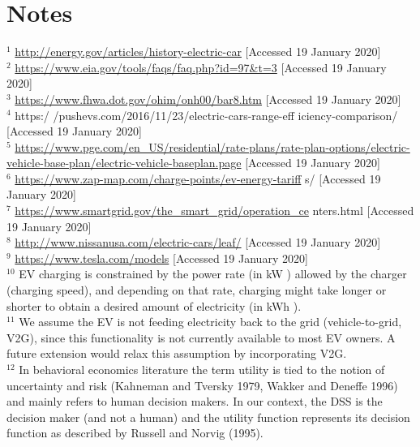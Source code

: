 \documentclass[10pt]{article}
\begin{document}
\section*{Notes}
${ }^{1}$ \href{http://energy.gov/articles/history-electric-car}{http://energy.gov/articles/history-electric-car} [Accessed 19 January 2020]\\
${ }^{2}$ \href{https://www.eia.gov/tools/faqs/faq.php?id=97&t=3}{https://www.eia.gov/tools/faqs/faq.php?id=97\&t=3} [Accessed 19 January 2020]\\
${ }^{3}$ \href{https://www.fhwa.dot.gov/ohim/onh00/bar8.htm}{https://www.fhwa.dot.gov/ohim/onh00/bar8.htm} [Accessed 19 January 2020]\\
${ }^{4}$ https:/ /pushevs.com/2016/11/23/electric-cars-range-eff iciency-comparison/ [Accessed 19 January 2020]\\
${ }^{5}$ \href{https://www.pge.com/en_US/residential/rate-plans/rate-plan-options/electric-vehicle-base-plan/electric-vehicle-baseplan.page}{https://www.pge.com/en\_US/residential/rate-plans/rate-plan-options/electric-vehicle-base-plan/electric-vehicle-baseplan.page} [Accessed 19 January 2020]\\
${ }^{6}$ \href{https://www.zap-map.com/charge-points/ev-energy-tariff}{https://www.zap-map.com/charge-points/ev-energy-tariff} s/ [Accessed 19 January 2020]\\
${ }^{7}$ \href{https://www.smartgrid.gov/the_smart_grid/operation_ce}{https://www.smartgrid.gov/the\_smart\_grid/operation\_ce} nters.html [Accessed 19 January 2020]\\
${ }^{8}$ \href{http://www.nissanusa.com/electric-cars/leaf/}{http://www.nissanusa.com/electric-cars/leaf/} [Accessed 19 January 2020]\\
${ }^{9}$ \href{https://www.tesla.com/models}{https://www.tesla.com/models} [Accessed 19 January 2020]\\
${ }^{10}$ EV charging is constrained by the power rate (in kW ) allowed by the charger (charging speed), and depending on that rate, charging might take longer or shorter to obtain a desired amount of electricity (in kWh ).\\
${ }^{11}$ We assume the EV is not feeding electricity back to the grid (vehicle-to-grid, V2G), since this functionality is not currently available to most EV owners. A future extension would relax this assumption by incorporating V2G.\\
${ }^{12}$ In behavioral economics literature the term utility is tied to the notion of uncertainty and risk (Kahneman and Tversky 1979, Wakker and Deneffe 1996) and mainly refers to human decision makers. In our context, the DSS is the decision maker (and not a human) and the utility function represents its decision function as described by Russell and Norvig (1995).\\
\end{document}
